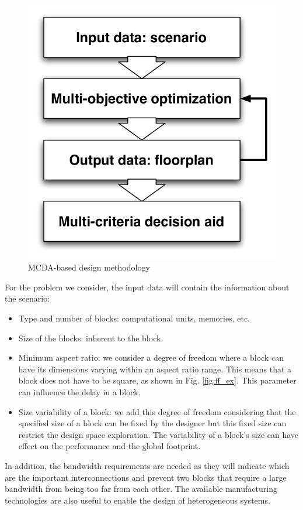 \begin{figure}[h!]
\begin{center}
\includegraphics[width=0.5\linewidth]{MCDA_Method.pdf}
\end{center}
\vspace{-0.5cm}
\caption{MCDA-based design methodology}
\label{fig:mcdaflow}
\end{figure}

For the problem we consider, the input data will contain the information about the scenario:
\begin{itemize}
\item Type and number of blocks: computational units, memories, etc.
\item Size of the blocks: inherent to the block.
\item Minimum aspect ratio: we consider a degree of freedom where a block can have its dimensions varying within an aspect ratio range. This means that a block does not have to be square, as shown in Fig. \ref{fig:ff_ex}. This parameter can influence the delay in a block.
\item Size variability of a block: we add this degree of freedom considering that the specified size of a block can be fixed by the designer but this fixed size can restrict the design space exploration. The variability of a block's size can have effect on the performance and the global footprint.
\end{itemize}
In addition, the bandwidth requirements are needed as they will indicate which are the important interconnections and prevent two blocks that require a large bandwidth from being too far from each other. The available manufacturing technologies are also useful to enable the design of heterogeneous systems.

